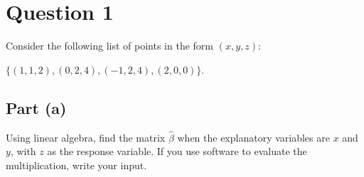 \section{Question 1}

\begin{question}
    Consider the following list of points in the form $(x,y,z)$:
    \begin{center}
        $\{(1,1,2), (0,2,4), (−1,2,4), (2,0,0)\}$.
    \end{center}
\end{question}

\subsection{Part (a)}
\begin{question}
    Using linear algebra, find the matrix $\hat{\beta}$ when the explanatory variables are $x$ and $y$, with $z$ as the response variable. If you use software to evaluate the multiplication, write your input.
\end{question}

